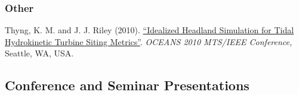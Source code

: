 \documentclass[10pt,letterpaper]{article}
\renewenvironment{itemize}{
  \begin{list}{}{
    \setlength{\leftmargin}{1.5em}
    \setlength{\itemsep}{0.25em}
    \setlength{\parskip}{0pt}
    \setlength{\parsep}{0.25em}
  }
}{
  \end{list}
}
\begin{document}
\subsubsection*{Other}

\begin{itemize}

\item Thyng, K. M. and J. J. Riley (2010). \href{http://froude.me.washington.edu/papers/thyng2010.pdf}{``Idealized Headland Simulation for Tidal Hydrokinetic Turbine Siting Metrics''}. \textit{OCEANS 2010 MTS/IEEE Conference,} Seattle, WA, USA.

\end{itemize}

\subsection*{Conference and Seminar Presentations}
\end{document}
